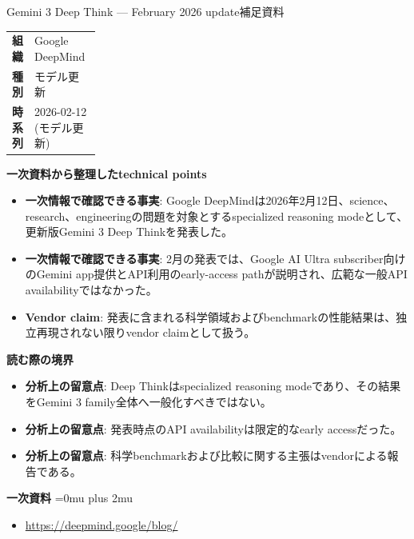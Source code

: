 \begin{technicalnote}{Gemini 3 Deep Think — February 2026 update}{補足資料}
\begingroup
\begin{tabularx}{\linewidth}{@{}>{\bfseries}p{0.22\linewidth}X@{}}
組織 & Google DeepMind \\
種別 & モデル更新 \\
時系列 & 2026-02-12 (モデル更新) \\
\end{tabularx}
\smallskip
{\bfseries 一次資料から整理したtechnical points}
\begin{itemize}[leftmargin=1.5em,itemsep=0.35em]
\item \textbf{一次情報で確認できる事実}: Google DeepMindは2026年2月12日、science、research、engineeringの問題を対象とするspecialized reasoning modeとして、更新版Gemini 3 Deep Thinkを発表した。
\item \textbf{一次情報で確認できる事実}: 2月の発表では、Google AI Ultra subscriber向けのGemini app提供とAPI利用のearly-access pathが説明され、広範な一般API availabilityではなかった。
\item \textbf{Vendor claim}: 発表に含まれる科学領域およびbenchmarkの性能結果は、独立再現されない限りvendor claimとして扱う。
\end{itemize}
\begin{minipage}{\linewidth}
{\bfseries 読む際の境界}
\begin{itemize}[leftmargin=1.5em,itemsep=0.35em]
\item \textbf{分析上の留意点}: Deep Thinkはspecialized reasoning modeであり、その結果をGemini 3 family全体へ一般化すべきではない。
\item \textbf{分析上の留意点}: 発表時点のAPI availabilityは限定的なearly accessだった。
\item \textbf{分析上の留意点}: 科学benchmarkおよび比較に関する主張はvendorによる報告である。
\end{itemize}
\begin{samepage}
{\bfseries 一次資料}
\begingroup\sloppy
\Urlmuskip=0mu plus 2mu\relax
\begin{itemize}[leftmargin=1.5em,itemsep=0.25em]
\item {\scriptsize\url{https://deepmind.google/blog/}}
\end{itemize}
\endgroup
\end{samepage}
\end{minipage}
\endgroup
\end{technicalnote}
\medskip

